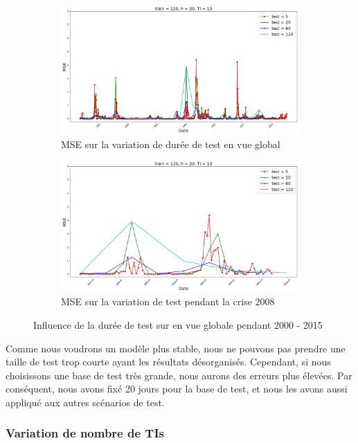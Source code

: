 \begin{figure}[H]
	\centering
	\begin{subfigure}{.5\textwidth}
	\includegraphics[width=.9\linewidth, scale=0.2]
	{plot/MSE_test_global.png}
	\caption{MSE sur la variation de durée de test en vue global}
	\label{fig:test_g}
	\end{subfigure}%
	\begin{subfigure}{.5\textwidth}
	\centering
	\includegraphics[width=.9\linewidth, scale=0.2]
	{plot/MSE_test_2008.png}
	\caption{MSE sur la variation de test pendant la crise 2008}
	\label{fig:test_2008}
	\end{subfigure}
\caption{Influence de la durée de test sur en vue globale pendant 2000 - 2015}
\label{fig:MSE_test}
\end{figure}

Comme nous voudrons un modèle plus stable, nous ne pouvons pas prendre une taille de test trop courte ayant les résultats désorganisés. Cependant, si nous choisissons une base de test très grande, nous aurons des erreurs plus élevées. Par conséquent, nous avons fixé 20 jours pour la base de test, et nous les avons aussi appliqué aux autres scénarios de test.



\subsubsection{Variation de nombre de TIs}

